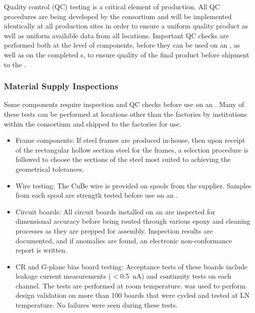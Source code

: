 Quality control (QC) testing is a critical element of  production.  All QC procedures are being developed by the consortium and will be implemented identically at all production sites in order to ensure a uniform quality product as well as uniform available data from all locations.  Important QC checks are performed both at the level of components, before they can be used on an , as well as on the completed s, to ensure quality of the final product before shipment to the .  

\subsubsection{Material Supply Inspections}

Some components require inspection and QC checks before use on an .  Many of these tests can be performed at locations other than the  factories by institutions within the consortium and shipped to the factories for use. 

\begin{itemize}
\item Frame components: If  steel frames are produced in-house, then upon receipt of the rectangular hollow section steel for the frames, a selection procedure is followed to choose the sections of the steel most suited to achieving the geometrical tolerances. 
\item Wire testing: The CuBe wire is provided on spools from the supplier. Samples from each spool are strength tested before use on an .
\item Circuit boards: All circuit boards installed on an  are inspected for dimensional accuracy before being routed through various epoxy and cleaning processes as they are prepped for assembly. Inspection results are documented, and if anomalies are found, an electronic non-conformance report is written.  %
\item CR and $G$-plane bias board testing: Acceptance tests of these boards include leakage current measurements ($<$\SI{0.5}{nA}) and continuity tests on each channel.  The tests are performed at room temperature.  was used to perform design validation on more than \num{100} boards that were cycled and tested at LN temperature. No failures were seen during these tests. 
\end{itemize}


